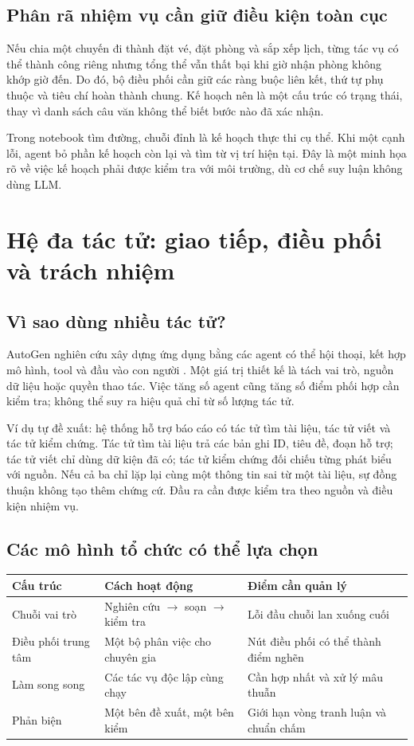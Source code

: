\subsection{Phân rã nhiệm vụ cần giữ điều kiện toàn cục}
Nếu chia một chuyến đi thành đặt vé, đặt phòng và sắp xếp lịch, từng tác vụ có thể
thành công riêng nhưng tổng thể vẫn thất bại khi giờ nhận phòng không khớp giờ đến.
Do đó, bộ điều phối cần giữ các ràng buộc liên kết, thứ tự phụ thuộc và tiêu chí hoàn
thành chung. Kế hoạch nên là một cấu trúc có trạng thái, thay vì danh sách câu văn
không thể biết bước nào đã xác nhận.

Trong notebook tìm đường, chuỗi đỉnh là kế hoạch thực thi cụ thể. Khi một cạnh lỗi,
agent bỏ phần kế hoạch còn lại và tìm từ vị trí hiện tại. Đây là một minh họa rõ về
việc kế hoạch phải được kiểm tra với môi trường, dù cơ chế suy luận không dùng LLM.

\par
\section{Hệ đa tác tử: giao tiếp, điều phối và trách nhiệm}
\subsection{Vì sao dùng nhiều tác tử?}
AutoGen nghiên cứu xây dựng ứng dụng bằng các agent có thể hội thoại, kết hợp mô hình,
tool và đầu vào con người \cite{autogen}. Một giá trị thiết kế là tách vai trò,
nguồn dữ liệu hoặc quyền thao tác. Việc tăng số agent cũng tăng số điểm phối hợp cần
kiểm tra; không thể suy ra hiệu quả chỉ từ số lượng tác tử.

Ví dụ tự đề xuất: hệ thống hỗ trợ báo cáo có tác tử tìm tài liệu, tác tử viết và tác tử
kiểm chứng. Tác tử tìm tài liệu trả các bản ghi ID, tiêu đề, đoạn hỗ trợ; tác tử viết
chỉ dùng dữ kiện đã có; tác tử kiểm chứng đối chiếu từng phát biểu với nguồn. Nếu cả
ba chỉ lặp lại cùng một thông tin sai từ một tài liệu, sự đồng thuận không tạo thêm
chứng cứ. Đầu ra cần được kiểm tra theo nguồn và điều kiện nhiệm vụ.

\subsection{Các mô hình tổ chức có thể lựa chọn}
\begin{center}\small
\begin{tabularx}{\linewidth}{@{}p{2.7cm}XX@{}}\toprule
\textbf{Cấu trúc} & \textbf{Cách hoạt động} & \textbf{Điểm cần quản lý}\\\midrule
Chuỗi vai trò & Nghiên cứu $\to$ soạn $\to$ kiểm tra & Lỗi đầu chuỗi lan xuống cuối\\
Điều phối trung tâm & Một bộ phân việc cho chuyên gia & Nút điều phối có thể thành điểm nghẽn\\
Làm song song & Các tác vụ độc lập cùng chạy & Cần hợp nhất và xử lý mâu thuẫn\\
Phản biện & Một bên đề xuất, một bên kiểm & Giới hạn vòng tranh luận và chuẩn chấm\\\bottomrule
\end{tabularx}\end{center}

